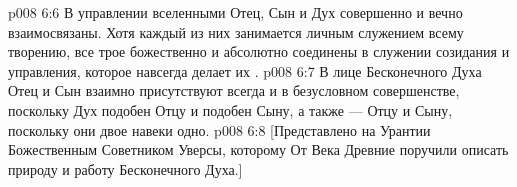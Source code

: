 \vs p008 6:6 \pc В управлении вселенными Отец, Сын и Дух совершенно и вечно взаимосвязаны. Хотя каждый из них занимается личным служением всему творению, все трое божественно и абсолютно соединены в служении созидания и управления, которое навсегда делает их .
\vs p008 6:7 В лице Бесконечного Духа Отец и Сын взаимно присутствуют всегда и в безусловном совершенстве, поскольку Дух подобен Отцу и подобен Сыну, а также --- Отцу и Сыну, поскольку они двое навеки одно.
\vsetoff
\vs p008 6:8 [Представлено на Урантии Божественным Советником Уверсы, которому От Века Древние поручили описать природу и работу Бесконечного Духа.]
\quizlink
